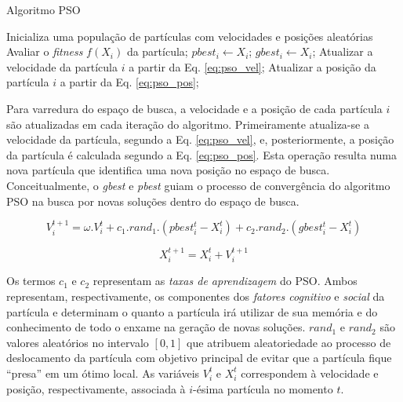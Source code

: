 \documentclass[
	12pt,				%
	openany,			%
	oneside,	
	a4paper,			%
	brazil,				%
	]{unimontes-ppgmsc-abntex2}
\begin{document}
\begin{algorithm}[ht]
\caption{Algoritmo PSO}
\label{alg:pseudo_pso}
\begin{algorithmic}[1]
\State Inicializa uma população de partículas com velocidades e posições aleatórias
		\State Avaliar o \textit{fitness} $f(X_i)$ da partícula;
		   \State $pbest_i \gets X_i$;
		\EndIf
		   \State $gbest_i \gets X_i$;
		\EndIf
		\State Atualizar a velocidade da partícula $i$ a partir da Eq. \ref{eq:pso_vel};
		\State Atualizar a posição da partícula $i$ a partir da Eq. \ref{eq:pso_pos};
	\EndFor
\EndWhile
\end{algorithmic}
\end{algorithm}

Para varredura do espaço de busca, a velocidade e a posição de cada partícula $i$ são atualizadas em cada iteração do algoritmo. Primeiramente atualiza-se a velocidade da partícula, segundo a Eq. \ref{eq:pso_vel}, e, posteriormente, a posição da partícula é calculada segundo a Eq. \ref{eq:pso_pos}. Esta operação resulta numa nova partícula que identifica uma nova posição no espaço de busca. Conceitualmente, o {\em gbest} e {\em pbest} guiam o processo de convergência do algoritmo PSO na busca por novas soluções dentro do espaço de busca. 

\begin{equation}
\label{eq:pso_vel}
V^{t+1}_{i} = \omega . V^{t}_{i} + c_1 . rand_1 . (pbest^{t}_{i} - X^{t}_{i}) + c_2 . rand_2 . (gbest^{t}_{i} - X^{t}_{i})
\end{equation}

\begin{equation}
\label{eq:pso_pos}
X^{t+1}_{i} = X^{t}_{i} + V^{t+1}_{i}
\end{equation}

Os termos $c_1$ e $c_2$ representam as {\em taxas de aprendizagem} do PSO. Ambos representam, respectivamente, os componentes dos {\em fatores cognitivo} e {\em social} da partícula e determinam o quanto a partícula irá utilizar de sua memória e do conhecimento de todo o enxame na geração de novas soluções. $rand_1$ e $rand_2$ são valores aleatórios no intervalo $[0,1]$ que atribuem aleatoriedade ao processo de deslocamento da partícula com objetivo principal de evitar que a partícula fique ``presa'' em um ótimo local. As variáveis $V^{t}_{i}$ e $X^{t}_{i}$ correspondem à velocidade e posição, respectivamente, associada à $i$-ésima partícula no momento $t$.
\end{document}
